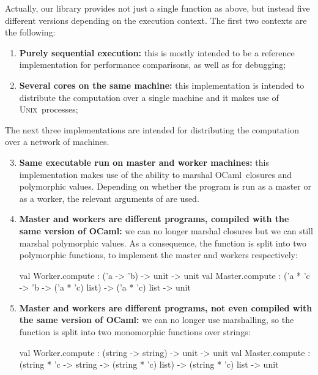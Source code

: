 \documentclass[a4paper,12pt]{article}
\newcommand{\Ocaml}{OCaml}
\newcommand{\unix}{\textsc{Unix}}
\begin{document}
Actually, our library provides not just a single 
function as above, but instead five different versions
depending on the execution context. 
The first two contexts are the following: 
\begin{enumerate}
\item \textbf{Purely sequential execution:}
  this is mostly intended to be a reference implementation
  for performance comparisons, as well as for debugging;

\item \textbf{Several cores on the same machine:} 
  this implementation is intended to distribute the computation over a
  single machine and it makes use of \unix\ processes;
\end{enumerate}
The next three implementations are intended for distributing the
computation over a network of machines.
\begin{enumerate}
\setcounter{enumi}{2}
\item \textbf{Same executable run on master and worker machines:}
  this implementation makes use of the ability to marshal \Ocaml\
  closures and polymorphic values.
  Depending on whether the program is run as a master or as a worker,
  the relevant arguments of \ocaml{compute} are used.

\item \textbf{Master and workers are different programs, compiled with
    the same version of \Ocaml:} 
  we can no longer marshal closures but we can still
  marshal polymorphic values. As a consequence, 
  the  function is split into two
  polymorphic functions, to implement the master and workers 
  respectively:%
\vspace{-1em}
\begin{ocaml}
val Worker.compute : ('a -> 'b) -> unit -> unit
val Master.compute : 
  ('a * 'c -> 'b -> ('a * 'c) list) -> 
  ('a * 'c) list -> unit
\end{ocaml}

\item \textbf{Master and workers are different programs, not even
    compiled with the same version of \Ocaml:} we can no
  longer use marshalling, so the
   function is split into two monomorphic functions
  over strings:%
\vspace{-1em}
\begin{ocaml}
val Worker.compute : (string -> string) -> unit -> unit
val Master.compute : 
  (string * 'c -> string -> (string * 'c) list) -> 
  (string * 'c) list -> unit
\end{ocaml}
\end{enumerate}
\end{document}
